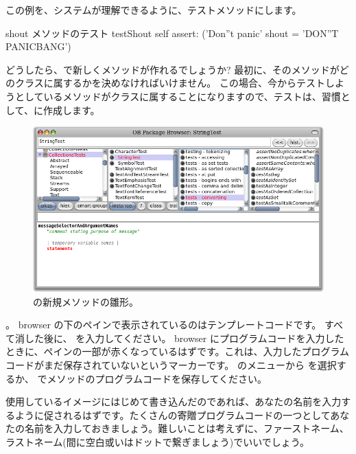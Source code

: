 \documentclass[a4paper,10pt,twoside]{book}
\begin{document}
\noindent
この例を、システムが理解できるように、テストメソッドにします。

\begin{method}[testShout]{shout メソッドのテスト}
testShout
	self assert: ('Don''t panic' shout = 'DON''T PANICBANG')
\end{method} %

どうしたら、\pharo で新しくメソッドが作れるでしょうか? 最初に、そのメソッドがどのクラスに属するかを決めなければいけません。
この場合、今からテストしようとしているメソッドがクラスに属することになりますので、テストは、習慣として、に作成します。

\begin{figure}[hbt]
\centerline {\includegraphics[width=\textwidth]{StringTest-newMethodTemplate}}
\caption{の新規メソッドの雛形。
}
\end{figure}

。
browser の下のペインで表示されているのはテンプレートコードです。
すべて消した後に、 を入力してください。
browser にプログラムコードを入力したときに、ペインの一部が赤くなっているはずです。これは、入力したプログラムコードがまだ保存されていないというマーカーです。
\actclick のメニューから  を選択するか、 でメソッドのプログラムコードを保存してください。

使用しているイメージにはじめて書き込んだのであれば、あなたの名前を入力するように促されるはずです。たくさんの寄贈プログラムコードの一つとしてあなたの名前を入力しておきましょう。難しいことは考えずに、ファーストネーム、ラストネーム(間に空白或いはドットで繋ぎましょう)でいいでしょう。
\end{document}
